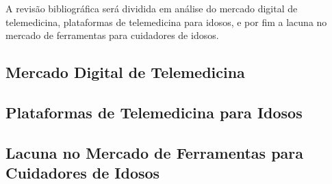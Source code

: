 \documentclass[
	article,			%
	12pt,				%
	oneside,			%
	a4paper,			%
    BIBLATEX,           %
	english,			%
	brazil,				%
	sumario=tradicional
	]{abntex2}
\begin{document}
A revisão bibliográfica será dividida em análise do mercado digital de telemedicina, plataformas de telemedicina para idosos, e por fim a lacuna no mercado de ferramentas para cuidadores de idosos.

\subsection{Mercado Digital de Telemedicina}


\subsection{Plataformas de Telemedicina para Idosos}


\subsection{Lacuna no Mercado de Ferramentas para Cuidadores de Idosos}

\end{document}
